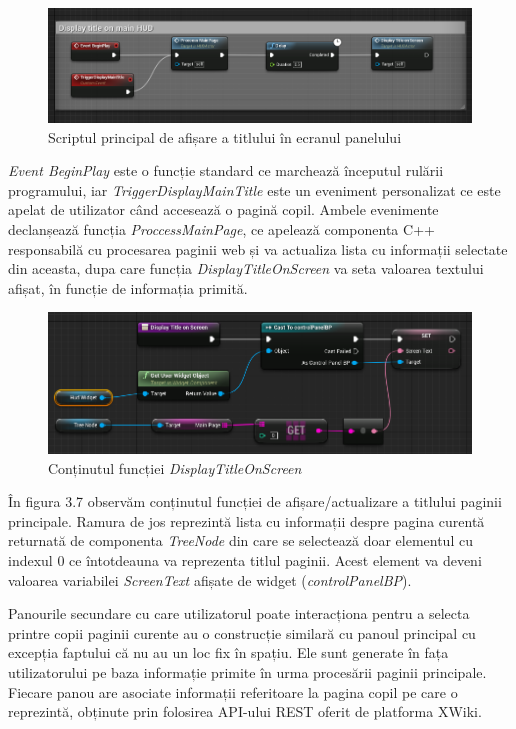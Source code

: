 \begin{figure}[h]
  \centering
  \includegraphics[scale=0.55]{img/DisplayTitleScript1.png}
  \caption{Scriptul principal de afișare a titlului în ecranul panelului}
\end{figure}

\textit{Event BeginPlay} este o funcție standard ce marchează începutul rulării programului, iar \textit{TriggerDisplayMainTitle} este un eveniment personalizat ce este apelat de utilizator când accesează o pagină copil. Ambele evenimente declanșează funcția \textit{ProccessMainPage}, ce apelează componenta C++ responsabilă cu procesarea paginii web și va actualiza lista cu informații selectate din aceasta, dupa care funcția \textit{DisplayTitleOnScreen} va seta valoarea textului afișat, în funcție de informația primită.
\newpage

\begin{figure}[h]
  \centering
  \includegraphics[scale=0.6]{img/DisplayTitleScript2.png}
  \caption{Conținutul funcției \textit{DisplayTitleOnScreen}}
\end{figure}

În figura 3.7 observăm conținutul funcției de afișare/actualizare a titlului paginii principale. Ramura de jos reprezintă lista cu informații despre pagina curentă returnată de componenta \textit{TreeNode} din care se selectează doar elementul cu indexul 0 ce întotdeauna va reprezenta titlul paginii. Acest element va deveni valoarea variabilei \textit{ScreenText} afișate de widget (\textit{controlPanelBP}).

Panourile secundare cu care utilizatorul poate interacționa pentru a selecta printre copii paginii curente au o construcție similară cu panoul principal cu excepția faptului că nu au un loc fix în spațiu. Ele sunt generate în fața utilizatorului pe baza informație primite în urma procesării paginii principale. Fiecare panou are asociate informații referitoare la pagina copil pe care o reprezintă, obținute prin folosirea API-ului REST oferit de platforma XWiki.

